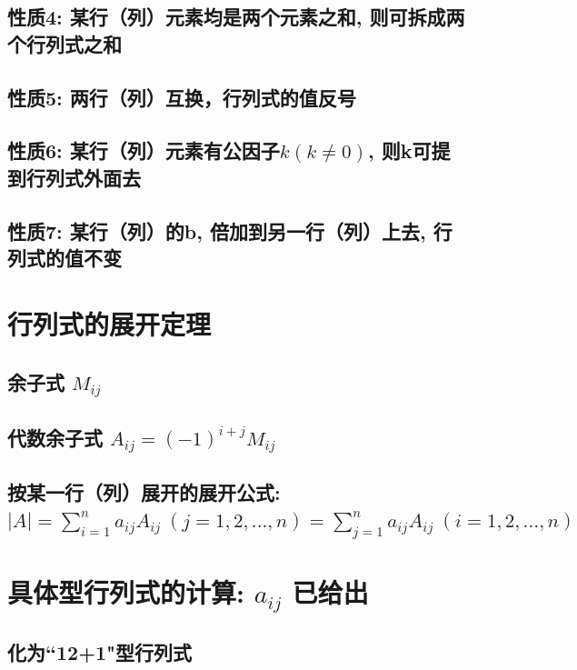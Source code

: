 \documentclass[UTF8]{ctexart}
\begin{document}
	\subsection{性质4: 某行（列）元素均是两个元素之和, 则可拆成两个行列式之和}
	
	\subsection{性质5: 两行（列）互换，行列式的值反号}
	
	\subsection{性质6: 某行（列）元素有公因子$k\left( k\ne 0 \right) $, 则k可提到行列式外面去 }
	
	\subsection{性质7: 某行（列）的b, 倍加到另一行（列）上去, 行列式的值不变 }
	
	
	\section{行列式的展开定理}
	
	\subsection{余子式 $M_{ij}$}
	
	\subsection{代数余子式 $	A_{ij}=\left( -1 \right) ^{i+j}M_{ij}$}
	
	\subsection{按某一行（列）展开的展开公式: \\ $|A|=\sum_{i=1}^n{a_{ij}A_{ij}\ \left( j=1,2,...,n \right)}=\sum_{j=1}^n{a_{ij}A_{ij}\ \left( i=1,2,...,n \right)}$	}
	
	
	
	\section{具体型行列式的计算: $a_{ij}$ 已给出}
	
	\subsection{化为``12+1"型行列式}
	
\end{document}
